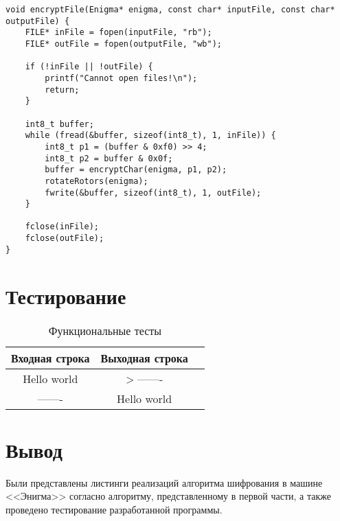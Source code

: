 \begin{center}
\begin{lstlisting}[label=lst:enigma1,caption=Реализация алгоритма шифрования машины <<Энигма>>]
void encryptFile(Enigma* enigma, const char* inputFile, const char* outputFile) {
	FILE* inFile = fopen(inputFile, "rb");
	FILE* outFile = fopen(outputFile, "wb");
	
	if (!inFile || !outFile) {
		printf("Cannot open files!\n");
		return;
	}
	
	int8_t buffer;
	while (fread(&buffer, sizeof(int8_t), 1, inFile)) {
		int8_t p1 = (buffer & 0xf0) >> 4;
		int8_t p2 = buffer & 0x0f;
		buffer = encryptChar(enigma, p1, p2);
		rotateRotors(enigma);
		fwrite(&buffer, sizeof(int8_t), 1, outFile);
	}
	
	fclose(inFile);
	fclose(outFile);
}

\end{lstlisting}
\end{center}

\section{Тестирование}
\begin{table}[ht!]
	\begin{center}
		\captionsetup{justification=raggedright,singlelinecheck=off}
		\caption{\label{tbl:functional_test} Функциональные тесты}
		\begin{tabular}{|c|c|c|}
			\hline
			Входная строка & Выходная строка \\ 
			\hline
			Hello world & >------- \\
			-------  & Hello world\\
			
			\hline
		\end{tabular}
	\end{center}
\end{table}

\section*{Вывод}

Были представлены листинги реализаций алгоритма шифрования в машине <<Энигма>> согласно алгоритму, представленному в первой части, а также проведено тестирование разработанной программы.